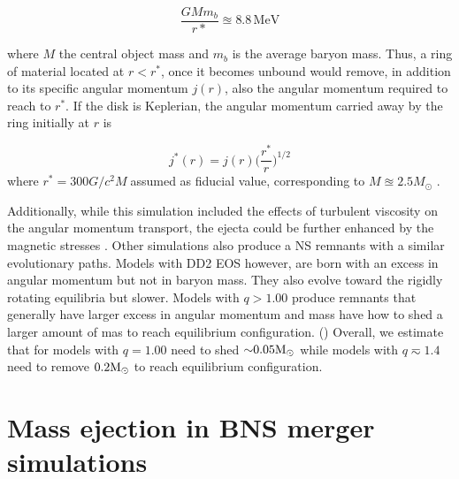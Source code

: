 \begin{equation*}
    \frac{G M m_b}{r*} \approxeq 8.8\, \text{MeV}
\end{equation*}

where $M$ the central object mass and $m_b$ is the average baryon mass.
Thus, a ring of material located at $r < r^*$, once it becomes unbound
would remove, in addition to its specific angular
momentum $j(r)$, also the angular momentum required to reach
to $r^*$. If the disk is Keplerian, the 
 angular momentum carried away by the ring initially at
$r$ is 

\begin{equation*}
    j^*(r) = j(r) \Big( \frac{r^*}{r} \Big)^{1/2}
\end{equation*}
%
where $r^* = 300 G/c^2M$assumed as fiducial value, corresponding
to $M \approxeq 2.5M_{\odot}$ \citep{Radice:2018xqa}.

Additionally, while this simulation included the effects of turbulent viscosity on the
angular momentum transport, the ejecta could be further enhanced by the magnetic stresses 
\citep{Metzger:2006mw,Bucciantini:2011kx,Siegel:2017nub,Fernandez:2018kax,Ciolfi:2020hgg}.
%
%
Other simulations also produce a \ac{NS} remnants with a similar evolutionary paths. 
Models with DD2 \ac{EOS} however, are born with an excess in angular momentum but not in 
baryon mass. They also evolve toward the rigidly rotating equilibria but slower.
Models with $q>1.00$ produce remnants that generally have larger excess in angular momentum 
and mass have how to shed a larger amount of mas to reach equilibrium configuration.
()
Overall, we estimate that for models with $q=1.00$ need to shed ${\sim}0.05{\text{M}_{\odot}}$ while 
models with $q\eqsim 1.4$ need to remove $0.2{\text{M}_{\odot}}$ to reach equilibrium configuration.
















\section{Mass ejection in \ac{BNS} merger simulations}

